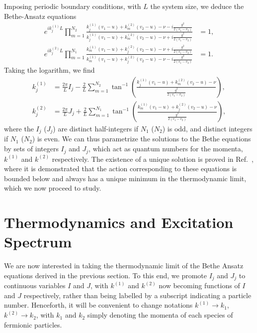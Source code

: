 \documentclass[aps,pra,
superscriptaddress,
reprint,twocolumn,preprintnumbers,
amsmath,amssymb,
nofootinbib]{revtex4-1}
\begin{document}
Imposing periodic boundary conditions, with $L$ the system size, we deduce the Bethe-Ansatz equations
		\begin{align}
		\label{eqn:14}
		e^{i k^{(1)}_j L} \prod_{m = 1}^{N_2} \frac{k^{(1)}_j(v_1 - u) + k^{(2)}_m(v_2 - u) - \nu - i\frac{g^2}{2(v_1 - v_2)}}{k^{(1)}_j(v_1 - u) + k^{(2)}_m(v_2 - u) - \nu + i\frac{g^2}{2(v_1 - v_2)}} & = 1 ,\nonumber \\
		e^{i k^{(2)}_j L} \prod_{m = 1}^{N_1} \frac{k^{(1)}_m(v_1 - u) + k^{(2)}_j(v_2 - u) - \nu + i\frac{g^2}{2(v_1 - v_2)}}{k^{(1)}_m(v_1 - u) + k^{(2)}_j(v_2 - u) - \nu - i\frac{g^2}{2(v_1 - v_2)}} & = 1 .
		\end{align}
Taking the logarithm, we find
		\begin{align}
		\label{eqn:15}
		k^{(1)}_j & =  \frac{2 \pi}{L} I_j - \frac{2}{L}\sum_{m=1}^{N_2} \tan^{-1}\left( \frac{k^{(1)}_j(v_1 - u) + k^{(2)}_m(v_2 - u) - \nu}{\frac{g^2}{2(v_1 - v_2)}}\right) ,\nonumber \\
		k^{(2)}_j & =  \frac{2 \pi}{L} J_j + \frac{2}{L}\sum_{m=1}^{N_1} \tan^{-1}\left( \frac{k^{(1)}_m(v_1 - u) + k^{(2)}_j(v_2 - u) - \nu}{\frac{g^2}{2(v_1 - v_2)}}\right) ,
		\end{align}
where the $I_j$ ($J_j$) are distinct half-integers if $N_1$ ($N_2$) is odd, and distinct integers if $N_1$ ($N_2$) is even. We can thus parametrize the solutions to the Bethe equations by sets of integers $I_j$ and $J_j$, which act as quantum numbers for the momenta, $k^{(1)}$ and $k^{(2)}$ respectively. The existence of a unique solution is proved in Ref.~\cite{Williams1998}, where it is demonstrated that the action corresponding to these equations is bounded below and always has a unique minimum in the thermodynamic limit, which we now proceed to study.


		\section{Thermodynamics and Excitation Spectrum}
		\label{TBA}
		
We are now interested in taking the thermodynamic limit of the Bethe Ansatz equations derived in the previous section. To this end, we promote $I_j$ and $J_j$ to continuous variables $I$ and $J$, with $k^{(1)}$ and $k^{(2)}$ now becoming functions of $I$ and $J$ respectively, 
rather than being labelled by a subscript indicating a particle number. Henceforth, it will be convenient to change notations $k^{(1)} \rightarrow k_1$, $k^{(2)} \rightarrow k_2$, 
with $k_1$ and $k_2$ simply denoting the momenta of each species of fermionic particles. 
\end{document}
